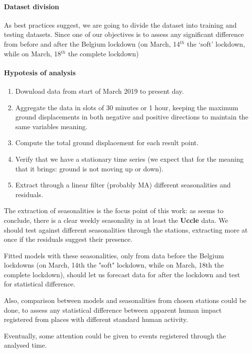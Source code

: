 \documentclass[12pt]{article}
\begin{document}
\paragraph{Dataset division}
As best practices suggest, we are going to divide the dataset into training and testing datasets. 
Since one of our objectives is to assess any significant difference from before and after the Belgium lockdown (on March, 14$^{th}$ the `soft' lockdown, while on March, 18$^{th}$ the complete lockdown)





\paragraph*{Hypotesis of analysis}

\begin{enumerate}
	\item Download data from start of March 2019 to present day.
	\item Aggregate the data in slots of 30 minutes or 1 hour, keeping the maximum ground displacements in both negative and positive directions to maintain the same variables meaning.
	\item Compute the total ground displacement for each result point.
	\item Verify that we have a stationary time series (we expect that for the meaning that it brings: ground is not moving up or down).
	\item Extract through a linear filter (probably MA) different seasonalities and residuals.
\end{enumerate}

The extraction of seasonalities is the focus point of this work: as \cite{NatureCoronavirusSeismic} seems to conclude, there is a clear weekly seasonality in at least the \textbf{Uccle} data. We should test against different seasonalities through the stations, extracting more at once if the residuals suggest their presence.

Fitted models with these seasonalities, only from data before the Belgium lockdowns (on March, 14th the "soft" lockdown, while on March, 18th the complete lockdown), should let us forecast data for after the lockdown and test for statistical difference.

Also, comparison between models and seasonalities from chosen stations could be done, to assess any statistical difference between apparent human impact registered from places with different standard human activity.

Eventually, some attention could be given to events registered through the analysed time.











\newpage

\end{document}
